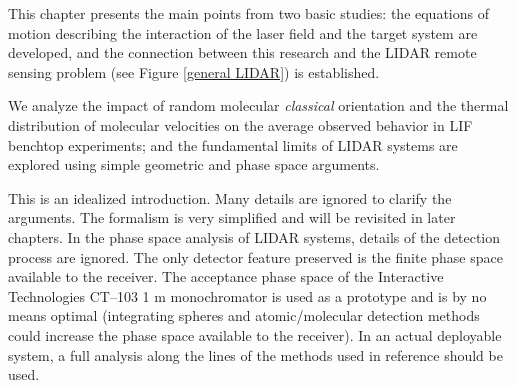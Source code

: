 This chapter presents the main points from two basic studies: the equations of motion describing the interaction of the laser field and the target system are developed, and the connection between this research and the LIDAR remote sensing problem (see Figure \ref{general LIDAR}) is established.

We analyze the impact of random molecular \emph{classical} orientation and the thermal distribution of molecular velocities on the average observed behavior in LIF benchtop experiments; and the fundamental limits of LIDAR systems are explored using simple geometric and phase space arguments.

This is an idealized introduction. Many details are ignored to clarify the arguments. The formalism is very simplified and will be revisited in later chapters. In the phase space analysis of LIDAR systems, details of the detection process are ignored. The only detector feature preserved is the finite phase space available to the receiver. The acceptance phase space of the Interactive Technologies CT--103 1 m monochromator is used as a prototype and is by no means optimal (integrating spheres and atomic/molecular detection methods could increase the phase space available to the receiver). In an actual deployable system, a full analysis along the lines of the methods used in reference \cite{Lienert:2005a} should be used.

